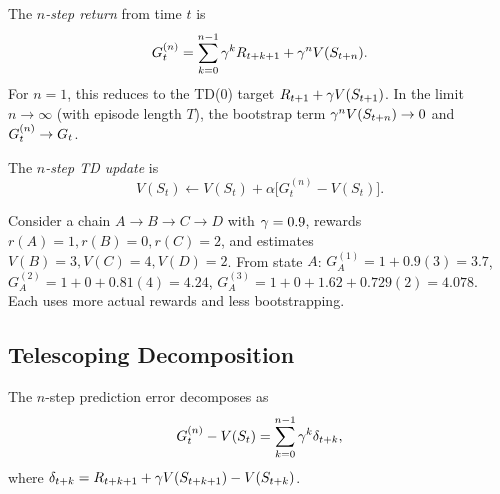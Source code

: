 \documentclass[11pt,a4paper]{article}
\begin{document}
\begin{definition}
\label{def:nstep_return}
The \emph{$n$-step return} from time $t$ is
\begin{equation}
  G_t^{(n)} = \sum_{k=0}^{n-1} \gamma^k R_{t+k+1}
  + \gamma^n V(S_{t+n}).
  \label{eq:nstep_return}
\end{equation}
For $n = 1$, this reduces to the TD(0) target
$R_{t+1} + \gamma V(S_{t+1})$. In the limit $n \to \infty$
(with episode length $T$), the bootstrap term
$\gamma^n V(S_{t+n}) \to 0$ and $G_t^{(n)} \to G_t$.
\end{definition}

\begin{definition}
\label{def:nstep_update}
The \emph{$n$-step TD update} is
\begin{equation}
  V(S_t) \leftarrow V(S_t)
  + \alpha\bigl[G_t^{(n)} - V(S_t)\bigr].
  \label{eq:nstep_update}
\end{equation}
\end{definition}

\begin{example}
\label{ex:nstep_chain}
Consider a chain $A \to B \to C \to D$ with $\gamma = 0.9$,
rewards $r(A) = 1, r(B) = 0, r(C) = 2$, and estimates
$V(B) = 3, V(C) = 4, V(D) = 2$. From state $A$:
$G_A^{(1)} = 1 + 0.9(3) = 3.7$,
$G_A^{(2)} = 1 + 0 + 0.81(4) = 4.24$,
$G_A^{(3)} = 1 + 0 + 1.62 + 0.729(2) = 4.078$.
Each uses more actual rewards and less bootstrapping.
\end{example}

\subsection{Telescoping Decomposition}
\label{subsec:nstep_telescope}

\begin{lemma}
\label{lem:nstep_telescope}
The $n$-step prediction error decomposes as
\begin{equation}
  G_t^{(n)} - V(S_t) = \sum_{k=0}^{n-1} \gamma^k \delta_{t+k},
  \label{eq:nstep_telescope}
\end{equation}
where $\delta_{t+k} = R_{t+k+1} + \gamma V(S_{t+k+1}) - V(S_{t+k})$.
\end{lemma}
\end{document}
